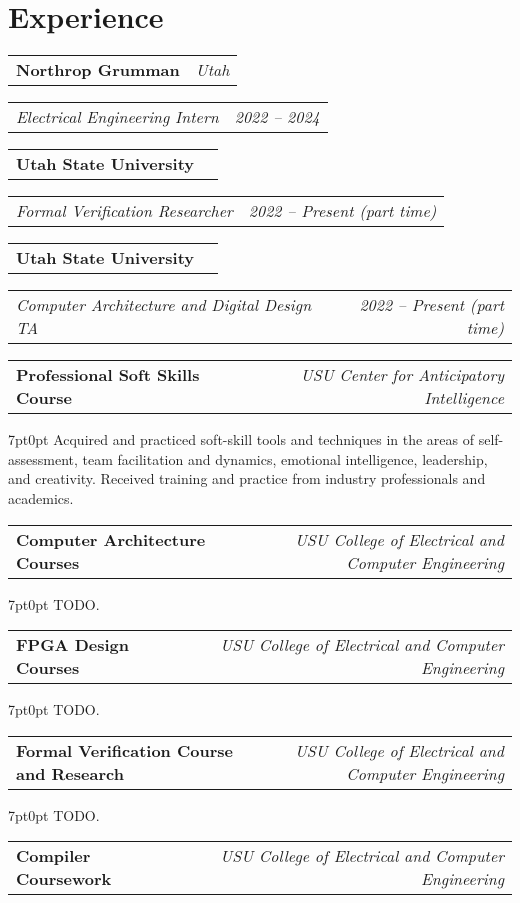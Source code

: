 \documentclass[letterpaper,12pt]{article}
\makeatletter
\newcommand{\simpleHeading}[2]{
    \vspace{-1pt}
    \begin{tabular*}{0.99\textwidth}[t]{l@{\extracolsep{\fill}}r}
        #1 & #2 \\
    \end{tabular*}
}
\newcommand{\positionHeading}[4]{
    \simpleHeading{\textbf{#1}}{\textit{#2}}
    \simpleHeading{\textit{#3}}{\textit{#4}}
}
\newcommand{\simpleParagraph}[1]{
    \vspace{-1pt}
    \begin{adjustwidth}{7pt}{0pt}
        #1
    \end{adjustwidth}
}
\makeatother
\begin{document}

\section{Experience}
    \positionHeading{Northrop Grumman}{Utah}{Electrical Engineering Intern}{2022 -- 2024}

    \vspace{10pt}
    \positionHeading{Utah State University}{}{Formal Verification Researcher}{2022 -- Present (part time)}

    \vspace{10pt}
    \positionHeading{Utah State University}{}
        {Computer Architecture and Digital Design TA}
        {2022 -- Present (part time)}

    \vspace{10pt}
    \simpleHeading{\textbf{Professional Soft Skills Course}}{\textit{USU Center for Anticipatory Intelligence}}

    \simpleParagraph{Acquired and practiced soft-skill tools and techniques in the areas of self-assessment, team facilitation and dynamics, emotional intelligence, leadership, and creativity. Received training and practice from industry professionals and academics.}
    
    \vspace{10pt}
    \simpleHeading{\textbf{Computer Architecture Courses}}{\textit{USU College of Electrical and Computer Engineering}}

    \simpleParagraph{TODO.}
    
    \vspace{10pt}
    \simpleHeading{\textbf{FPGA Design Courses}}{\textit{USU College of Electrical and Computer Engineering}}

    \simpleParagraph{TODO.}
    
    \vspace{10pt}
    \simpleHeading{\textbf{Formal Verification Course and Research}}{\textit{USU College of Electrical and Computer Engineering}}

    \simpleParagraph{TODO.}
    
    \vspace{10pt}
    \simpleHeading{\textbf{Compiler Coursework}}{\textit{USU College of Electrical and Computer Engineering}}
\end{document}
